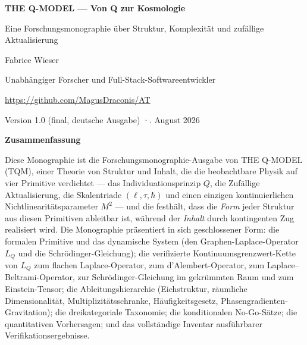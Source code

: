 \documentclass[10pt,twoside,openany]{book}
\begin{document}

\frontmatter

\begin{center}
{\LARGE\bfseries THE Q-MODEL — Von Q zur Kosmologie\par}
\vspace{0.4em}
{\large Eine Forschungsmonographie über Struktur, Komplexität und zufällige Aktualisierung\par}
\vspace{1.0em}
{\normalsize Fabrice Wieser\par}
{\small Unabhängiger Forscher und Full-Stack-Softwareentwickler\par}
{\small \url{https://github.com/MagusDraconis/AT}\par}
\vspace{0.5em}
{\normalsize Version 1.0 (final, deutsche Ausgabe) \quad·. August 2026\par}
\end{center}

\vspace{0.8em}

{\centering\Large\bfseries Zusammenfassung\par}
\vspace{0.3em}
\noindent
Diese Monographie ist die Forschungsmonographie-Ausgabe von THE Q-MODEL (TQM), einer
Theorie von Struktur und Inhalt, die die beobachtbare Physik auf vier Primitive verdichtet
--- das Individuationsprinzip $Q$, die Zufällige Aktualisierung, die Skalentriade
$(\ell,\tau,\hbar)$ und einen einzigen kontinuierlichen Nichtlinearitätsparameter $M^2$ ---
und die festhält, dass die \emph{Form} jeder Struktur aus diesen Primitiven ableitbar ist,
während der \emph{Inhalt} durch kontingenten Zug realisiert wird. Die Monographie
präsentiert in sich geschlossener Form: die formalen Primitive und das dynamische System
(den Graphen-Laplace-Operator $L_Q$ und die Schr\"odinger-Gleichung); die verifizierte
Kontinuumsgrenzwert-Kette von $L_Q$ zum flachen Laplace-Operator, zum d'Alembert-Operator,
zum Laplace--Beltrami-Operator, zur Schr\"odinger-Gleichung im gekrümmten Raum und zum
Einstein-Tensor; die Ableitungshierarchie (Eichstruktur, räumliche Dimensionalität,
Multiplizitätsschranke, Häufigkeitsgesetz, Phasengradienten-Gravitation); die
dreikategoriale Taxonomie; die konditionalen No-Go-Sätze; die quantitativen Vorhersagen;
und das vollständige Inventar ausführbarer Verifikationsergebnisse.
\end{document}
